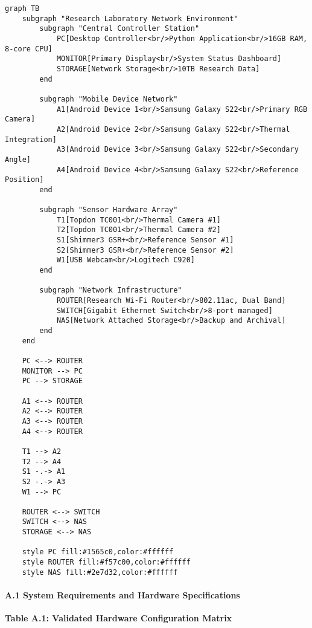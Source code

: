 \documentclass[11pt,a4paper]{article}
\begin{document}
\begin{verbatim}
graph TB
    subgraph "Research Laboratory Network Environment"
        subgraph "Central Controller Station"
            PC[Desktop Controller<br/>Python Application<br/>16GB RAM, 8-core CPU]
            MONITOR[Primary Display<br/>System Status Dashboard]
            STORAGE[Network Storage<br/>10TB Research Data]
        end

        subgraph "Mobile Device Network"
            A1[Android Device 1<br/>Samsung Galaxy S22<br/>Primary RGB Camera]
            A2[Android Device 2<br/>Samsung Galaxy S22<br/>Thermal Integration]
            A3[Android Device 3<br/>Samsung Galaxy S22<br/>Secondary Angle]
            A4[Android Device 4<br/>Samsung Galaxy S22<br/>Reference Position]
        end

        subgraph "Sensor Hardware Array"
            T1[Topdon TC001<br/>Thermal Camera #1]
            T2[Topdon TC001<br/>Thermal Camera #2]
            S1[Shimmer3 GSR+<br/>Reference Sensor #1]
            S2[Shimmer3 GSR+<br/>Reference Sensor #2]
            W1[USB Webcam<br/>Logitech C920]
        end

        subgraph "Network Infrastructure"
            ROUTER[Research Wi-Fi Router<br/>802.11ac, Dual Band]
            SWITCH[Gigabit Ethernet Switch<br/>8-port managed]
            NAS[Network Attached Storage<br/>Backup and Archival]
        end
    end

    PC <--> ROUTER
    MONITOR --> PC
    PC --> STORAGE

    A1 <--> ROUTER
    A2 <--> ROUTER
    A3 <--> ROUTER
    A4 <--> ROUTER

    T1 --> A2
    T2 --> A4
    S1 -.-> A1
    S2 -.-> A3
    W1 --> PC

    ROUTER <--> SWITCH
    SWITCH <--> NAS
    STORAGE <--> NAS

    style PC fill:#1565c0,color:#ffffff
    style ROUTER fill:#f57c00,color:#ffffff
    style NAS fill:#2e7d32,color:#ffffff
\end{verbatim}

\paragraph{A.1 System Requirements and Hardware Specifications}

\textbf{Table A.1: Validated Hardware Configuration Matrix}
\end{document}
